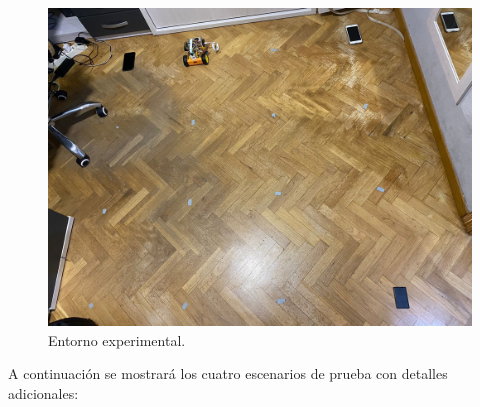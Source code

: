 \begin{figure}[H]
  \centering
  \includegraphics[scale=0.15]{figs/escenario} %
  \caption{ Entorno experimental.}
  \label{fig:escenario}
\end{figure} 

A continuación se mostrará los cuatro escenarios de prueba con detalles adicionales:




